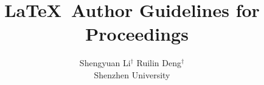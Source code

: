 \documentclass[10pt,twocolumn,letterpaper]{article}
\title{\LaTeX\ Author Guidelines for \confName~Proceedings}
\author{
Shengyuan Li$^{\dagger}$ \quad Ruilin Deng$^{\dagger}$ \\
Shenzhen University \\
}
\begin{document}
\maketitle

    



{
    \small
    
    
}

% 
\end{document}
